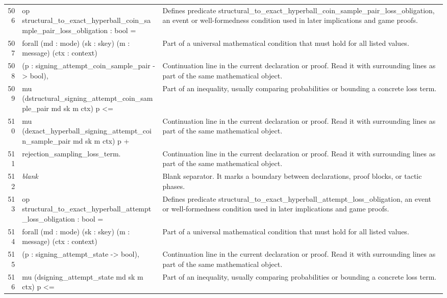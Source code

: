 \documentclass[10pt]{article}
\begin{document}
\begin{longtable}{r L{0.53\textwidth} L{0.37\textwidth}}
506 & {\ttfamily\scriptsize op structural\_to\_exact\_hyperball\_coin\_sample\_pair\_loss\_obligation : bool =} & Defines predicate structural\_to\_exact\_hyperball\_coin\_sample\_pair\_loss\_obligation, an event or well-formedness condition used in later implications and game proofs. \\
507 & {\ttfamily\scriptsize   forall (md : mode) (sk : skey) (m : message) (ctx : context)} & Part of a universal mathematical condition that must hold for all listed values. \\
508 & {\ttfamily\scriptsize          (p : signing\_attempt\_coin\_sample\_pair -> bool),} & Continuation line in the current declaration or proof.  Read it with surrounding lines as part of the same mathematical object. \\
509 & {\ttfamily\scriptsize     mu (dstructural\_signing\_attempt\_coin\_sample\_pair md sk m ctx) p <=} & Part of an inequality, usually comparing probabilities or bounding a concrete loss term. \\
510 & {\ttfamily\scriptsize     mu (dexact\_hyperball\_signing\_attempt\_coin\_sample\_pair md sk m ctx) p +} & Continuation line in the current declaration or proof.  Read it with surrounding lines as part of the same mathematical object. \\
511 & {\ttfamily\scriptsize       rejection\_sampling\_loss\_term.} & Continuation line in the current declaration or proof.  Read it with surrounding lines as part of the same mathematical object. \\
512 & {\ttfamily\scriptsize \emph{blank}} & Blank separator.  It marks a boundary between declarations, proof blocks, or tactic phases. \\
513 & {\ttfamily\scriptsize op structural\_to\_exact\_hyperball\_attempt\_loss\_obligation : bool =} & Defines predicate structural\_to\_exact\_hyperball\_attempt\_loss\_obligation, an event or well-formedness condition used in later implications and game proofs. \\
514 & {\ttfamily\scriptsize   forall (md : mode) (sk : skey) (m : message) (ctx : context)} & Part of a universal mathematical condition that must hold for all listed values. \\
515 & {\ttfamily\scriptsize          (p : signing\_attempt\_state -> bool),} & Continuation line in the current declaration or proof.  Read it with surrounding lines as part of the same mathematical object. \\
516 & {\ttfamily\scriptsize     mu (dsigning\_attempt\_state md sk m ctx) p <=} & Part of an inequality, usually comparing probabilities or bounding a concrete loss term. \\

\end{longtable}
\end{document}

